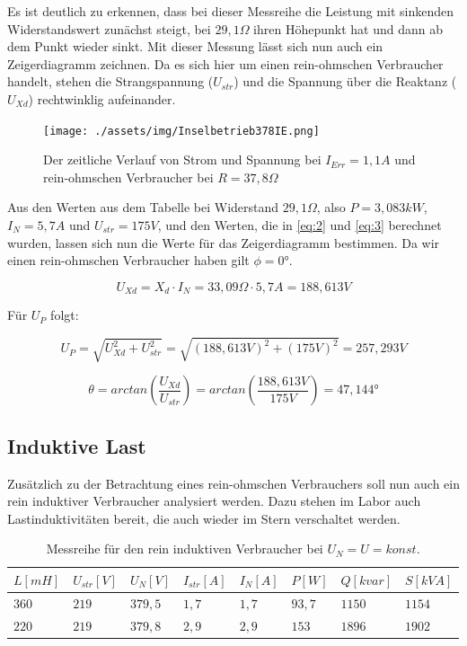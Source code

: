 \documentclass{report}
\begin{document}
Es ist deutlich zu erkennen, dass bei dieser Messreihe die Leistung mit sinkenden Widerstandswert zunächst steigt, bei $29,1\Omega$ ihren Höhepunkt hat und dann ab dem Punkt wieder sinkt. Mit dieser Messung lässt sich nun auch ein Zeigerdiagramm zeichnen. Da es sich hier um einen rein-ohmschen Verbraucher handelt, stehen die Strangspannung ($U_{str}$) und die Spannung über die Reaktanz ($U_{Xd}$) rechtwinklig aufeinander.

\begin{figure}[!ht]
	\centering
	\texttt{[image: ./assets/img/Inselbetrieb378IE.png]}
	\caption{Der zeitliche Verlauf von Strom und Spannung bei $I_{Err} = 1,1A$ und rein-ohmschen Verbraucher bei $R=37,8\Omega$}
	\label{fig:inselbetrieb_ohm_oszi}
\end{figure}

Aus den Werten aus dem Tabelle bei Widerstand $29,1\Omega$, also $P=3,083kW$, $I_{N} = 5,7A$ und $U_{str} = 175V$, und den Werten, die in \ref{eq:2} und \ref{eq:3} berechnet wurden, lassen sich nun die Werte für das Zeigerdiagramm bestimmen. Da wir einen rein-ohmschen Verbraucher haben gilt $\phi = 0°$.

\begin{equation}
	\label{eq:4}
	U_{Xd} = X_{d} \cdot I_{N} = 33,09\Omega \cdot 5,7A = 188,613V
\end{equation}

Für $U_{P}$ folgt:

\begin{equation}
	\label{eq:5}
	U_{P} = \sqrt{U_{Xd}^{2} + U_{str}^{2}} = \sqrt{(188,613V)^{2} + (175V)^{2}} = 257,293V
\end{equation}

\begin{equation}
	\label{eq:6}
	\theta = arctan(\frac{U_{Xd}}{U_{str}}) = arctan(\frac{188,613V}{175V}) = 47,144°
\end{equation}

\subsection{Induktive Last}
\label{sec:induktive-last}

Zusätzlich zu der Betrachtung eines rein-ohmschen Verbrauchers soll nun auch ein rein induktiver Verbraucher analysiert werden. Dazu stehen im Labor auch Lastinduktivitäten bereit, die auch wieder im Stern verschaltet werden.


\begin{table}[!ht]
	\centering
	\begin{tabular}{llllllll}
		\hline
		$L [mH]$ & $U_{str} [V]$ & $U_{N} [V]$ & $I_{str} [A]$ & $I_{N} [A]$ & $P [W]$ & $Q [kvar]$ & $S [kVA]$ \\ \hline
		$360$    & $219$         & $379,5$     & $1,7$         & $1,7$       & $93,7$  & $1150$     & $1154$    \\
		$220$    & $219$         & $379,8$     & $2,9$         & $2,9$       & $153$   & $1896$     & $1902$    \\ \hline
	\end{tabular}
	\label{tab:induk_messreihe_1}
	\caption{Messreihe für den rein induktiven Verbraucher bei $U_{N} = U = konst.$}
\end{table}
\end{document}
